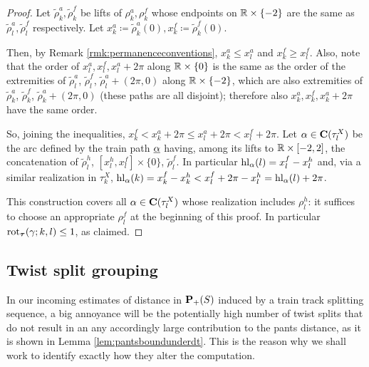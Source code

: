 \begin{proof}
Let $\tilde\rho_k^a,\tilde\rho_k^f$ be lifts of $\rho_k^a,\rho_k^f$ whose endpoints on $\mathbb R\times\{-2\}$ are the same as $\tilde\rho_l^a,\tilde\rho_l^f$ respectively. Let $x_k^a\coloneqq\tilde\rho_k^a(0),x_k^f\coloneqq\tilde\rho_k^f(0)$.

Then, by Remark \ref{rmk:permanenceconventions}, $x_k^a\leq x_l^a$ and $x_k^f\geq x_l^f$. Also, note that the order of $x_l^a,x_l^f,x_l^a+2\pi$ along $\mathbb R\times\{0\}$ is the same as the order of the extremities of $\tilde\rho_l^a$, $\tilde\rho_l^f$, $\tilde\rho_l^a+(2\pi,0)$ along $\mathbb R\times\{-2\}$, which are also extremities of $\tilde\rho_k^a$, $\tilde\rho_k^f$, $\tilde\rho_k^a+(2\pi,0)$ (these paths are all disjoint); therefore also $x_k^a,x_k^f,x_k^a+2\pi$ have the same order.

So, joining the inequalities, $x_k^f< x_k^a+2\pi\leq x_l^a+2\pi < x_l^f+2\pi$. Let $\alpha\in\mathbf C(\tau_l^X)$ be the arc defined by the train path $\underline{\alpha}$ having, among its lifts to $\mathbb R\times[-2,2]$, the concatenation of $\tilde\rho_l^h$, $[x_l^h,x_l^f]\times\{0\}$, $\tilde\rho_l^f$. In particular $\mathrm{hl}_{\alpha}(l)=x_l^f-x_l^h$ and, via a similar realization in $\tau_k^X$, $\mathrm{hl}_{\alpha}(k)=x_k^f-x_k^h < x_l^f+2\pi-x_l^h=\mathrm{hl}_{\alpha}(l)+2\pi$.

This construction covers all $\alpha\in\mathbf C(\tau_l^X)$ whose realization includes $\rho_l^h$: it suffices to choose an appropriate $\rho_l^f$ at the beginning of this proof. In particular $\mathrm{rot}_{\bm\tau}(\gamma;k,l)\leq 1$, as claimed.
\end{proof}

\subsection{Twist split grouping}\label{sub:rearrang}
In our incoming estimates of distance in ${\mathbf{P}_+}(S)$ induced by a train track splitting sequence, a big annoyance will be the potentially high number of twist splits that do not result in an any accordingly large contribution to the pants distance, as it is shown in Lemma \ref{lem:pantsboundunderdt}. This is the reason why we shall work to identify exactly how they alter the computation.


